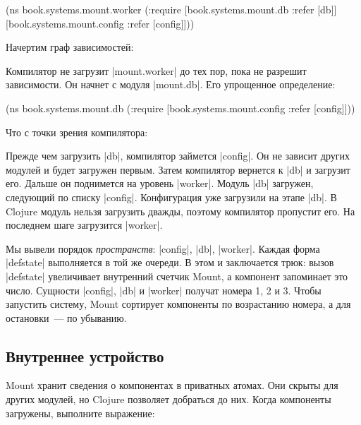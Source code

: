 \begin{english}
  \begin{clojure}
(ns book.systems.mount.worker
  (:require
   [book.systems.mount.db :refer [db]]
   [book.systems.mount.config :refer [config]]))
  \end{clojure}
\end{english}

Начертим граф зависимостей:


Компилятор не загрузит \spverb|mount.worker| до тех пор, пока не разрешит
зависимости. Он начнет с модуля \spverb|mount.db|. Его упрощенное определение:

\begin{english}
  \begin{clojure}
(ns book.systems.mount.db
  (:require
   [book.systems.mount.config :refer [config]]))
  \end{clojure}
\end{english}

Что с точки зрения компилятора:


Прежде чем загрузить \spverb|db|, компилятор займется \spverb|config|. Он не
зависит других модулей и будет загружен первым. Затем компилятор вернется к
\spverb|db| и загрузит его. Дальше он поднимется на уровень
\spverb|worker|. Модуль \spverb|db| загружен, следующий по списку
\spverb|config|. Конфигурация уже загрузили на этапе \spverb|db|. В Clojure
модуль нельзя загрузить дважды, поэтому компилятор пропустит его. На последнем
шаге загрузится \spverb|worker|.

Мы вывели порядок \emph{пространств}: \spverb|config|, \spverb|db|,
\spverb|worker|. Каждая форма \spverb|defstate| выполняется в той же очереди. В
этом и заключается трюк: вызов \spverb|defstate| увеличивает внутренний счетчик
Mount, а компонент запоминает это число. Сущности \spverb|config|, \spverb|db| и
\spverb|worker| получат номера 1, 2 и 3. Чтобы запустить систему, Mount
сортирует компоненты по возрастанию номера, а для остановки~--- по убыванию.

\subsection{Внутреннее устройство}

Mount хранит сведения о компонентах в приватных атомах. Они скрыты для других
модулей, но Clojure позволяет добраться до них. Когда компоненты загружены,
выполните выражение:

